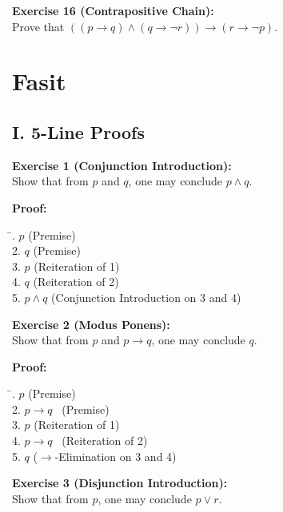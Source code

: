 \documentclass[12pt]{article}
\begin{document}
\bigskip
\textbf{Exercise 16 (Contrapositive Chain):}\\[0.3em]
Prove that \(((p\to q)\land (q\to \lnot r))\to (r\to \lnot p)\).



\pagebreak
\section{Fasit}

\subsection{I. 5-Line Proofs}

\bigskip
\textbf{Exercise 1 (Conjunction Introduction):}\\[0.3em]
Show that from \(p\) and \(q\), one may conclude \(p\land q\). 

\textbf{Proof:}
\begin{tabbing}
\hspace*{2cm}\= . \quad \(p\) \quad \quad \quad (Premise)\\[0.5em]
2. \quad \(q\) \quad \quad \quad (Premise)\\[0.5em]
3. \quad \(p\) \quad \quad \quad (Reiteration of 1)\\[0.5em]
4. \quad \(q\) \quad \quad \quad (Reiteration of 2)\\[0.5em]
5. \quad \(p\land q\) \quad (Conjunction Introduction on 3 and 4)
\end{tabbing}

\bigskip
\textbf{Exercise 2 (Modus Ponens):}\\[0.3em]
Show that from \(p\) and \(p\to q\), one may conclude \(q\).

\textbf{Proof:}
\begin{tabbing}
\hspace*{2cm}\= . \quad \(p\) \quad \quad \quad (Premise)\\[0.5em]
2. \quad \(p\to q\) \quad \ (Premise)\\[0.5em]
3. \quad \(p\) \quad \quad \quad (Reiteration of 1)\\[0.5em]
4. \quad \(p\to q\) \quad \ (Reiteration of 2)\\[0.5em]
5. \quad \(q\) \quad \quad \quad (\(\to\)-Elimination on 3 and 4)
\end{tabbing}

\bigskip
\textbf{Exercise 3 (Disjunction Introduction):}\\[0.3em]
Show that from \(p\), one may conclude \(p\lor r\).
\end{document}
